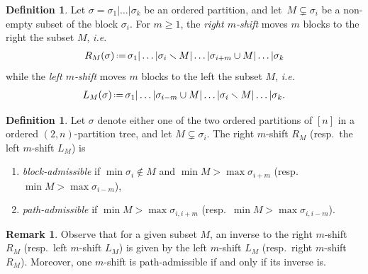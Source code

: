 \documentclass{amsart}
\newcommand{\darkblue}{\color{darkblue}} %
\theoremstyle{definition}
\newtheorem{definition}[theorem]{Definition}
\newtheorem{remark}[theorem]{Remark}
\newcommand{\ssm}{\smallsetminus} %
\newcommand{\eqdef}{\mbox{\,\raisebox{0.2ex}{\scriptsize\ensuremath{\mathrm:}}\ensuremath{=}\,}} %
\newcommand{\ie}{\textit{i.e.}~} %
\newcommand{\resp}{resp.~} %
\newcommand{\defn}[1]{\textsl{\darkblue #1}} %
\begin{document}
\begin{definition}
\label{def:subset shifts}
Let $\sigma=\sigma_1|\dots|\sigma_k$ be an ordered partition, and let~$M \subsetneq \sigma_{i}$ be a non-empty subset of the block $\sigma_i$.
For $m\geq 1$, the \defn{right $m$-shift} moves $m$ blocks to the right the subset $M$, \ie
\begin{align*}
	R_M(\sigma) \eqdef \sigma_1 | \dots | \sigma_i \ssm M | \dots | \sigma_{i+m} \cup M | \dots | \sigma_k
\end{align*}
while the \defn{left $m$-shift} moves $m$ blocks to the left the subset $M$, \ie
\begin{align*}
	L_M(\sigma) \eqdef \sigma_1 | \dots | \sigma_{i-m} \cup M | \dots | \sigma_{i} \ssm M | \dots | \sigma_k .
\end{align*}
\end{definition}

\begin{definition}
\label{def:movable-subsets}
Let $\sigma$ denote either one of the two ordered partitions of $[n]$ in a ordered $(2,n)$-partition tree, and let $M \subsetneq \sigma_i$.
The right $m$-shift $R_M$ (\resp the left $m$-shift $L_M$) is 
\begin{enumerate}
	\item \defn{block-admissible} if $\min \sigma_i \notin M$ and $\min M > \max \sigma_{i+m}$ (\resp $\min M > \max \sigma_{i-m}$),
	\item \defn{path-admissible} if $\min M > \max \sigma_{i,i+m}$ (\resp $\min M > \max \sigma_{i,i-m}$).
\end{enumerate}
\end{definition}

\begin{remark}
\label{rem:inverses}
Observe that for a given subset $M$, an inverse to the right $m$-shift $R_M$ (\resp left $m$-shift $L_M$) is given by the left $m$-shift $L_M$ (\resp right $m$-shift $R_M$).
Moreover, one $m$-shift is path-admissible if and only if its inverse is. 
\end{remark}
\end{document}
